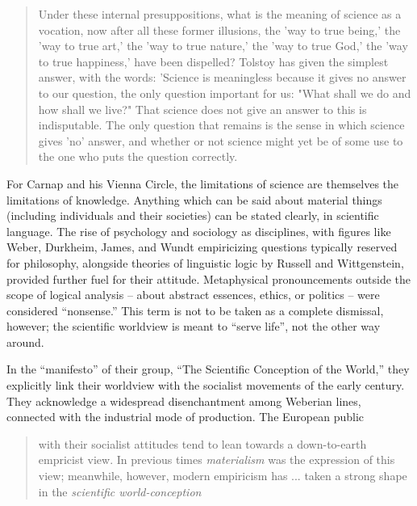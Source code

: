 \documentclass[leqno, 12pt]{turabian-researchpaper}
\begin{document}
	\blockquote[{\cite[139]{weber2014}}]{Under these internal presuppositions, what is the meaning of science as a vocation, now after all these former illusions, the 'way to true being,' the 'way to true art,' the 'way to true nature,' the 'way to true God,' the 'way to true happiness,' have been dispelled? Tolstoy has given the simplest answer, with the words: 'Science is meaningless because it gives no answer to our question, the only question important for us: "What shall we do and how shall we live?" That science does not give an answer to this is indisputable. The only question that remains is the sense in which science gives 'no' answer, and whether or not science might yet be of some use to the one who puts the question correctly.}

	For Carnap and his Vienna Circle, the limitations of science are themselves the
	limitations of knowledge. Anything which can be said about material things (including
	individuals and their societies) can be stated clearly, in scientific language.
	The rise of psychology and sociology as disciplines, with figures like Weber,
	Durkheim, James, and Wundt empiricizing questions typically reserved for
	philosophy, alongside theories of linguistic logic by Russell and Wittgenstein,
	provided further fuel for their attitude. Metaphysical pronouncements outside the
	scope of logical analysis -- about abstract essences, ethics, or politics -- were
	considered \enquote{nonsense.} This term is not to be taken as a complete
	dismissal, however; the scientific worldview is meant to \enquote{serve life},
	not the other way around.

	In the \enquote{manifesto} of their group, \enquote{The Scientific Conception of the World,}
	\nocite{hahn1973} they explicitly link their worldview with the socialist
	movements of the early  century. They acknowledge a widespread
	disenchantment among Weberian lines, connected with the industrial mode of production.
	The European public \blockquote[{\cite[pp. 21-22]{hahn1973}}]{with their socialist attitudes tend to lean towards a down-to-earth empricist view. In previous times \emph{materialism} was the expression of this view; meanwhile, however, modern empiricism has ... taken a strong shape in the \emph{scientific world-conception}}.
\end{document}
